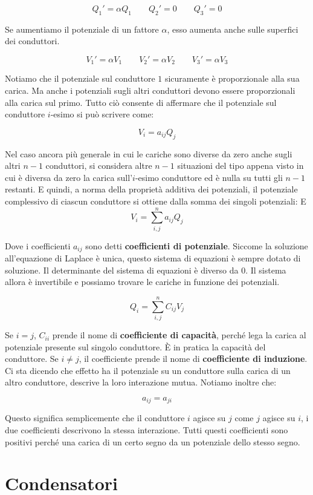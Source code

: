 \[
	Q_1' = \alpha Q_1 \qquad Q_2'=0 \qquad Q_3'= 0
\]

Se aumentiamo il potenziale di un fattore $\alpha$, esso aumenta anche sulle superfici dei conduttori.

\[
	V_1'=\alpha V_1 \qquad V_2'=\alpha V_2 \qquad V_3'=\alpha V_3
\]

Notiamo che il potenziale sul conduttore $1$ sicuramente è proporzionale alla sua carica. Ma anche i potenziali sugli altri conduttori devono essere proporzionali alla carica sul primo. Tutto ciò consente di affermare che il potenziale sul conduttore $i$-esimo si può scrivere come:

\[
	V_i = a_{ij}Q_j
\]

Nel caso ancora più generale in cui le cariche sono diverse da zero anche sugli altri $n-1$ conduttori, si considera altre $n-1$ situazioni del tipo appena visto in cui è diversa da zero la carica sull'$i$-esimo conduttore ed è nulla su tutti gli $n-1$ restanti. E quindi, a norma della proprietà additiva dei potenziali, il potenziale complessivo di ciascun conduttore si ottiene dalla somma dei singoli potenziali:
E\[
	V_i = \sum_{i,j}^n a_{ij}Q_j
\]

Dove i coefficienti $ a_{ij}  $ sono detti \textbf{coefficienti di potenziale}. Siccome la soluzione all'equazione di Laplace è unica, questo sistema di equazioni è sempre dotato di soluzione. Il determinante del sistema di equazioni è diverso da $0$. Il sistema allora è invertibile e possiamo trovare le cariche in funzione dei potenziali.

\[
	Q_i = \sum_{i,j}^n C_{ij}V_j
\]

Se $i=j$, $C_{ii} $ prende il nome di \textbf{coefficiente di capacità}, perché lega la carica al potenziale presente sul singolo conduttore. È in pratica la capacità del conduttore. Se $i\neq j$, il coefficiente prende il nome di \textbf{coefficiente di induzione}. Ci sta dicendo che effetto ha il potenziale su un conduttore sulla carica di un altro conduttore, descrive la loro interazione mutua.
Notiamo inoltre che:

\[
	a_{ij} = a_{ji}
\]

Questo significa semplicemente che il conduttore $i$ agisce su $j$ come $j$ agisce su $i$, i due coefficienti descrivono la stessa interazione.
Tutti questi coefficienti sono positivi perché una carica di un certo segno da un potenziale dello stesso segno.

\section{Condensatori}

